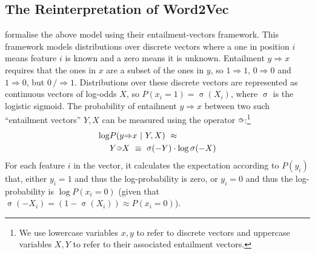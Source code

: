 \documentclass[11pt,a4paper]{article}
\DeclareMathOperator*{\sig}{\sigma}
\newcommand{\entail}{{\Rightarrow}}
\newcommand{\notentail}{{\,/\!\!\!\!{\Rightarrow}}}
\newcommand{\bie}{{\raisebox{1.8pt}{\makebox[0pt][l]{\hspace{1.3pt}${\scriptscriptstyle >}$}${\scriptscriptstyle \bigcirc}$}}}
\begin{document}
\subsection{The Reinterpretation of Word2Vec}

\citet{Henderson16_acl} formalise the above model using their
entailment-vectors framework.  This framework models distributions over
discrete vectors where a one in position $i$ means feature $i$ is known and a
zero means it is unknown.  Entailment $y\entail x$ requires that the ones in
$x$ are a subset of the ones in $y$, so $1\entail 1$, $0\entail 0$ and
$1\entail 0$, but $0\notentail 1$.  Distributions over these discrete vectors
are represented as continuous vectors of log-odds $X$, so
$P(x_i{=}1)=\sig(X_i)$, where $\sig$ is the logistic sigmoid.  The probability
of entailment $y\entail x$ between two such ``entailment vectors'' $Y,X$ can
be measured using the operator $\bie$:\footnote{We use lowercase variables
  $x,y$ to refer to discrete vectors and uppercase variables $X,Y$ to refer to
  their associated entailment vectors.}
\begin{align}
  \log &P(y\entail x ~|~ Y,X) ~\approx~
  \nonumber
  \\
  &
  Y \bie X
  ~\equiv~ \sig({-}Y) \cdot \log\sig({-}X)
  \label{eqn:bie}
\end{align}
For each feature $i$ in the vector, it calculates the expectation according to
$P(y_i)$ that, either $y_i{=}1$ and thus the log-probability is zero, or
$y_i{=}0$ and thus the log-probability is $\log P(x_i{=}0)$ (given that
$\sig({-}X_i)=(1-\sig(X_i))\approx P(x_i{=}0)$).
\end{document}
